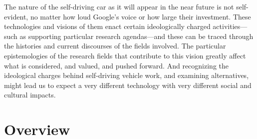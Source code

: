 

The nature of the self-driving car as it will appear in
the near future is not self-evident, no matter how loud Google's voice
or how large their investment. These technologies and visions of them
enact certain ideologically charged activities---such as supporting
particular research agendas---and these can be traced through the
histories and current discourses of the fields involved.
The particular epistemologies of the research fields that contribute
to this vision greatly affect what is considered, and valued, and
pushed forward. And recognizing the ideological charges behind
self-driving vehicle 
work, and examining alternatives, might lead us to expect a very
different technology with very
different social and cultural impacts. 


\section{Overview}

